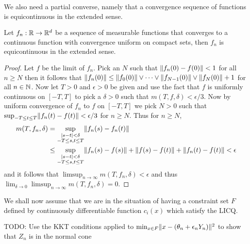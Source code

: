 We also need a partial converse, namely that a convergence sequence of functions is equicontinuous in the extended sense.
\begin{prop}\label{PartialConverseExtendedArzelaAscoli}Let $f_n : \mathbb{R} \to \mathbb{R}^d$ be a sequence of measurable functions that converges to a continuous function with convergence uniform on compact sets, then $f_n$ is equicontinuous in the extended sense.
\end{prop}
\begin{proof}
Let $f$ be the limit of $f_n$.  Pick an $N$ such that $\lVert f_n(0) - f(0) \rVert < 1$ for all $n \geq N$ then it follows that $\lVert f_n(0) \rVert \leq \lVert f_0(0) \rVert \vee \dotsb \vee \lVert f_{N-1}(0) \rVert \vee \lVert f_N(0) \rVert + 1$ for all $n \in \mathbb{N}$.  Now let $T > 0$ and $\epsilon > 0$ be given and use the fact that $f$ is uniformly continuous on $[-T,T]$ to pick 
a $\delta > 0$ such that $m(T, f, \delta) < \epsilon/3$.  Now by uniform convergence of $f_n$ to $f$ on $[-T,T]$ we pick $N > 0$ such that $\sup_{-T \leq t \leq T} \lVert f_n(t) - f(t) \rVert < \epsilon/3$ for $n \geq N$.  Thus for $n \geq N$,
\begin{align*}
m(T,f_n,\delta) &= \sup_{\substack{
\left \vert s -t \right \vert < \delta \\
-T \leq s,t \leq T}} \lVert f_n(s) - f_n(t) \rVert \\
&\leq \sup_{\substack{
\left \vert s -t \right \vert < \delta \\
-T \leq s,t \leq T}} \lVert f_n(s) - f(s) \rVert + \lVert f(s) - f(t) \rVert + \lVert f_n(t) - f(t) \rVert < \epsilon
\end{align*}
and it follows that $\limsup_{n \to \infty} m(T, f_n, \delta) < \epsilon$ and thus $\lim_{\delta \to 0} \limsup_{n \to \infty} m(T, f_n, \delta) = 0$.
\end{proof}


We shall now assume that we are in the situation of having a constraint set $F$ defined by continuously differentiable function $c_i(x)$ which satisfy the LICQ.  

TODO:  Use the KKT  conditions applied to $\min_{x \in F} \lVert x - (\theta_n + \epsilon_n Y_n) \rVert^2$ to show that $Z_n$ is in the normal cone 


